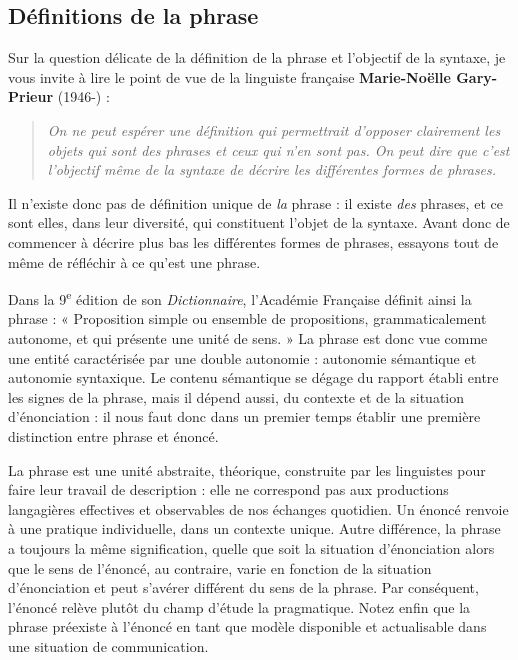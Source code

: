 \subsection{Définitions de la phrase}
Sur la question délicate de la définition de la phrase et l’objectif de la syntaxe, je vous invite à lire le point de vue de la linguiste française \textbf{Marie-Noëlle Gary-Prieur} (1946-) :
\begin{quote}\small\itshape
On ne peut espérer une définition qui permettrait d’opposer clairement les objets qui sont des phrases et ceux qui n’en sont pas. On peut dire que c’est l’objectif même de la syntaxe de décrire les différentes formes de phrases.
\end{quote}

Il n’existe donc pas de définition unique de \textit{la} phrase : il existe \textit{des} phrases, et ce sont elles, dans leur diversité, qui constituent l’objet de la syntaxe. Avant donc de commencer à décrire plus bas les différentes formes de phrases, essayons tout de même de réfléchir à ce qu’est une phrase.

Dans la 9\textsuperscript{e} édition de son \textit{Dictionnaire}, l’Académie Française définit ainsi la phrase : « Proposition simple ou ensemble de propositions, grammaticalement autonome, et qui présente une unité de sens. » La phrase est donc vue comme une entité caractérisée par une double autonomie : autonomie sémantique et autonomie syntaxique. Le contenu sémantique se dégage du rapport établi entre les signes de la phrase, mais il dépend aussi, du contexte et de la situation d’énonciation : il nous faut donc dans un premier temps établir une première distinction entre phrase et énoncé.

La phrase est une unité abstraite, théorique, construite par les linguistes pour faire leur travail de description : elle ne correspond pas aux productions langagières effectives et observables de nos échanges quotidien. Un énoncé renvoie à une pratique individuelle, dans un contexte unique. Autre différence, la phrase a toujours la même signification, quelle que soit la situation d’énonciation alors que le sens de l’énoncé, au contraire, varie en fonction de la situation d’énonciation et peut s’avérer différent du sens de la phrase. Par conséquent, l’énoncé relève plutôt du champ d’étude la pragmatique. Notez enfin que la phrase préexiste à l’énoncé en tant que modèle disponible et actualisable dans une situation de communication.

